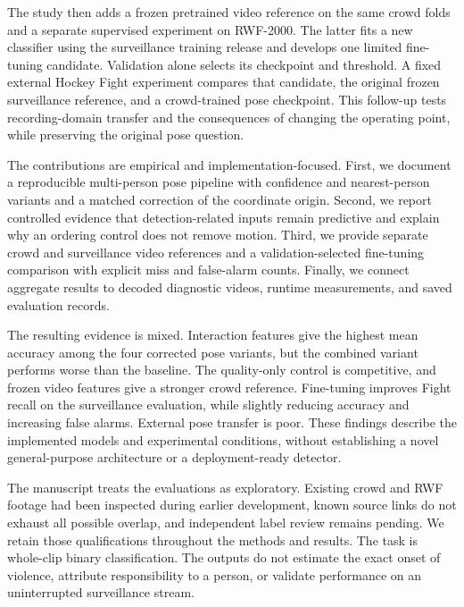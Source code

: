 \documentclass[journal]{IEEEtai}
\begin{document}
The study then adds a frozen pretrained video reference on the same crowd folds and a separate supervised experiment on RWF-2000. The latter fits a new classifier using the surveillance training release and develops one limited fine-tuning candidate. Validation alone selects its checkpoint and threshold. A fixed external Hockey Fight experiment compares that candidate, the original frozen surveillance reference, and a crowd-trained pose checkpoint. This follow-up tests recording-domain transfer and the consequences of changing the operating point, while preserving the original pose question.

The contributions are empirical and implementation-focused. First, we document a reproducible multi-person pose pipeline with confidence and nearest-person variants and a matched correction of the coordinate origin. Second, we report controlled evidence that detection-related inputs remain predictive and explain why an ordering control does not remove motion. Third, we provide separate crowd and surveillance video references and a validation-selected fine-tuning comparison with explicit miss and false-alarm counts. Finally, we connect aggregate results to decoded diagnostic videos, runtime measurements, and saved evaluation records.

The resulting evidence is mixed. Interaction features give the highest mean accuracy among the four corrected pose variants, but the combined variant performs worse than the baseline. The quality-only control is competitive, and frozen video features give a stronger crowd reference. Fine-tuning improves Fight recall on the surveillance evaluation, while slightly reducing accuracy and increasing false alarms. External pose transfer is poor. These findings describe the implemented models and experimental conditions, without establishing a novel general-purpose architecture or a deployment-ready detector.

The manuscript treats the evaluations as exploratory. Existing crowd and RWF footage had been inspected during earlier development, known source links do not exhaust all possible overlap, and independent label review remains pending. We retain those qualifications throughout the methods and results. The task is whole-clip binary classification. The outputs do not estimate the exact onset of violence, attribute responsibility to a person, or validate performance on an uninterrupted surveillance stream.



\end{document}
